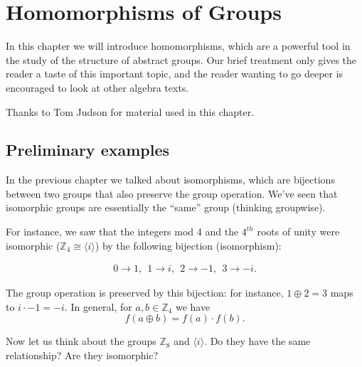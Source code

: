 

\chapter{Homomorphisms of Groups}\label{homomorph}


In this chapter we will introduce homomorphisms, which are a powerful tool in the study of the structure of abstract groups. Our brief treatment only gives the reader a taste of this important topic, and the reader wanting to go deeper is encouraged to look at other algebra texts.
\bigskip

Thanks to Tom Judson for material used in this chapter.
 
\section{Preliminary examples}
\label{sec:homomorph_defn_ex}

  
In the previous chapter we talked about isomorphisms, which are bijections between two groups that also preserve
the group operation. We've seen that isomorphic groups are essentially the ``same'' group (thinking groupwise). 

For instance, we saw that the integers mod 4 and the $4^{th}$ roots of unity were isomorphic (${\mathbb Z_4} \cong \langle i \rangle$)  by the following bijection (isomorphism):

\begin{align*}
    0 \rightarrow 1 ,~~     1 \rightarrow i,~~    2 \rightarrow -1,~~   3 \rightarrow -i.
\end{align*}

The group operation is preserved by this bijection:  for instance, $1  \oplus 2=3$ maps to 
$i \cdot -1 = -i$.
In general, for $a,b \in {\mathbb Z_4}$ we have
$$f(a \oplus b) = f(a) \cdot f(b).$$

 Now let us think about the groups \emph{ ${\mathbb Z_8}$} and $\langle i \rangle$.  Do they have the same relationship?  Are they isomorphic? 

